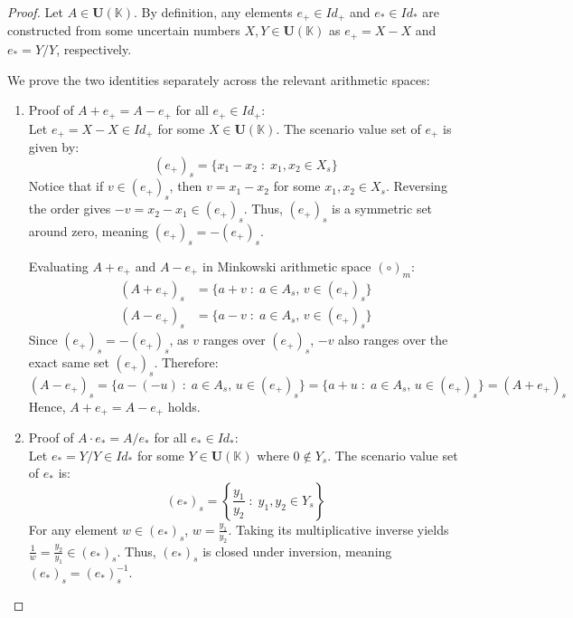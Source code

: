 \documentclass[a4paper,12pt,twoside]{memoir}
\newcommand{\tsbd}[1]{\mathbf{U}(\mathbb{#1})}
\begin{document}
	\begin{proof}
		Let $A \in \tsbd{K}$. By definition, any elements $e_+ \in Id_+$ and $e_* \in Id_*$ are constructed from some uncertain numbers $X, Y \in \tsbd{K}$ as $e_+ = X - X$ and $e_* = Y / Y$, respectively.
		
		We prove the two identities separately across the relevant arithmetic spaces:
		
		\begin{enumerate}[leftmargin=*]
			\item Proof of $A + e_+ = A - e_+$ for all $e_+ \in Id_+$: \\
			Let $e_+ = X - X \in Id_+$ for some $X \in \tsbd{K}$. The scenario value set of $e_+$ is given by:
			\[
			(e_+)_s = \{x_1 - x_2 \;:\; x_1, x_2 \in X_s\}
			\]
			Notice that if $v \in (e_+)_s$, then $v = x_1 - x_2$ for some $x_1, x_2 \in X_s$. Reversing the order gives $-v = x_2 - x_1 \in (e_+)_s$. Thus, $(e_+)_s$ is a symmetric set around zero, meaning $(e_+)_s = -(e_+)_s$.
			
			Evaluating $A + e_+$ and $A - e_+$ in Minkowski arithmetic space $(\circ)_m$:
			\begin{align*}
				(A + e_+)_s & = \{a + v \;:\; a \in A_s, \, v \in (e_+)_s\}  \\
				(A - e_+)_s & = \{a - v \;:\; a \in A_s, \, v \in (e_+)_s\}
			\end{align*}
			Since $(e_+)_s = -(e_+)_s$, as $v$ ranges over $(e_+)_s$, $-v$ also ranges over the exact same set $(e_+)_s$. Therefore:
			\[
			(A - e_+)_s = \{a - (-u) \;:\; a \in A_s, \, u \in (e_+)_s\} = \{a + u \;:\; a \in A_s, \, u \in (e_+)_s\} = (A + e_+)_s
			\]
			Hence, $A + e_+ = A - e_+$ holds.
			
			\item Proof of $A \cdot e_* = A / e_*$ for all $e_* \in Id_*$: \\
			Let $e_* = Y / Y \in Id_*$ for some $Y \in \tsbd{K}$ where $0 \notin Y_s$. The scenario value set of $e_*$ is:
			\[
			(e_*)_s = \left\{ \frac{y_1}{y_2} \;:\; y_1, y_2 \in Y_s \right\}
			\]
			For any element $w \in (e_*)_s$, $w = \frac{y_1}{y_2}$. Taking its multiplicative inverse yields $\frac{1}{w} = \frac{y_2}{y_1} \in (e_*)_s$. Thus, $(e_*)_s$ is closed under inversion, meaning $(e_*)_s = (e_*)_s^{-1}$.
			

\end{enumerate}
\end{proof}
\end{document}
